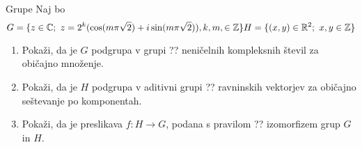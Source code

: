 \begin{frame}{Grupe}
	Naj bo
	$$
	G = \{z \in \mathbb{C};~z=2^k(\cos(m\pi\sqrt{2})+i\sin(m\pi\sqrt{2})), k, m, \in \mathbb{Z} \}
	H = \{ (x,y) \in \mathbb{R}^2;~x,y\in\mathbb{Z} \}
	$$
	\begin{enumerate}
		\item
			Pokaži, da je $G$ podgrupa v grupi ??
			neničelnih kompleksnih števil za običajno množenje.
		\item
			Pokaži, da je $H$ podgrupa v aditivni grupi ??
			ravninskih vektorjev za običajno seštevanje po komponentah.
		\item
			Pokaži, da je preslikava $f:H\to G$, podana s pravilom
			??
			izomorfizem grup $G$ in $H$.
	\end{enumerate}
\end{frame}
